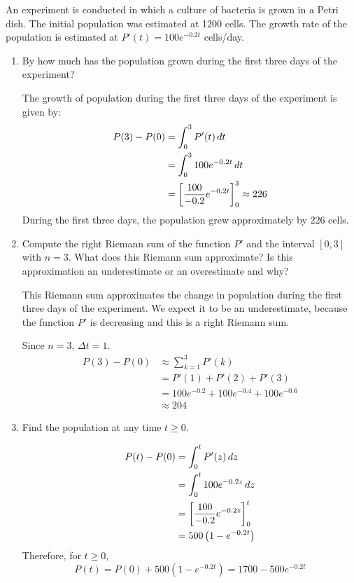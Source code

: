 \documentclass{ximera}
\begin{document}
\begin{example}
An experiment is conducted in which a culture of bacteria is grown in a Petri dish. The initial population was  estimated at 1200 cells. 
The  growth rate of the population is estimated at  $P'(t)=100e^{-0.2 t}$ cells/day.
\begin{enumerate}
\item By how much has the population grown during the first three days of the experiment?
\begin{explanation}
The growth of population during the first three days of the experiment is given by:
\begin{align*}
  P(3)-P(0) &=\int_0^3 P'(t)\mathop{}\!d t\\
  &=\int_0^3 100 e^{-0.2 t}\mathop{}\!d t\\
  &=\bigg[ \frac{100}{-0.2}e^{-0.2 t} \bigg]_0^3\approx 226
\end{align*}
During the first three  days, the population  grew  approximately by 226 cells. 
\end{explanation}

\item 
Compute the right Riemann sum of the function $P'$ and the interval $[0,3]$ with $n=3$.
What does this Riemann sum approximate?  Is this approximation an underestimate or an overestimate and why?


\begin{explanation}
This Riemann sum approximates the change in population during the first three days of the experiment.
We expect it to be an underestimate, because the function $P'$ is decreasing and this is a right Riemann sum.

Since $n=3$,  $\Delta t=1$.
\begin{align*}
  P(3)-P(0) &\approx\sum_{k=1}^3P'(k)\\
  &=P'(1)+P'(2)+P'(3)\\
  &=100e^{-0.2 }+100e^{-0.4}+100e^{-0.6}\\
  &\approx 204
\end{align*}
\end{explanation}
\item Find the population at any time $t\ge0$.
\begin{explanation}
\begin{align*}
  P(t)-P(0)&=\int_0^t P'(z)\mathop{}\!d z\\
  &=\int_0^t 100 e^{-0.2 z}\mathop{}\!d z\\
  &=\bigg[ \frac{100}{-0.2}e^{-0.2 z} \bigg]_0^t\\
  &=500\left(1-e^{-0.2 t}\right)
\end{align*}
Therefore, for $t\ge0$,
\[
P(t)=P(0)+500\left(1-e^{-0.2 t}\right)=1700 -500e^{-0.2 t}
\]
\end{explanation}
\end{enumerate}
\end{example}
\end{document}
